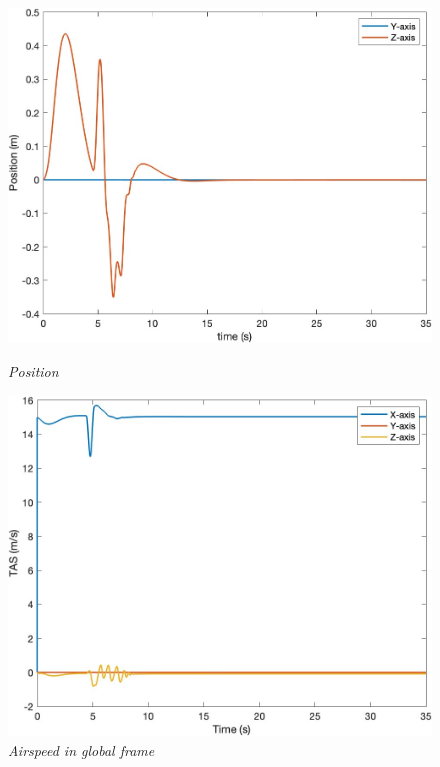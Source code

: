 \begin{figure}[htbp]
  \centering
  \begin{minipage}[b]{0.45\textwidth}
    \centering
    \includegraphics[width=\textwidth]{Images/Gust/Gust FWD pulse 0428/1 position_2.jpg}
    \caption*{\textit{Position}}
  \end{minipage}
  \hfil
  \begin{minipage}[b]{0.45\textwidth}
    \centering
    \includegraphics[width=\textwidth]{Images/Gust/Gust FWD pulse 0428/2 TAS_2.jpg}
    \caption*{\textit{Airspeed in global frame}}
  \end{minipage}

\end{figure}
